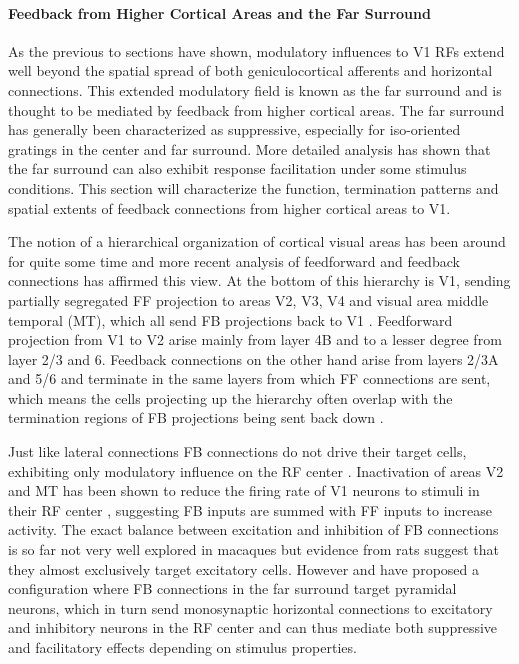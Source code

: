 \paragraph{Feedback from Higher Cortical Areas and the Far Surround}


As the previous to sections have shown, modulatory influences to V1
RFs extend well beyond the spatial spread of both geniculocortical
afferents and horizontal connections. This extended modulatory field
is known as the far surround and is thought to be mediated by feedback
from higher cortical areas. The far surround has generally been
characterized as suppressive, especially for iso-oriented gratings in
the center and far surround. More detailed analysis has shown that the
far surround can also exhibit response facilitation under some
stimulus conditions. This section will characterize the function,
termination patterns and spatial extents of feedback connections from
higher cortical areas to V1.

The notion of a hierarchical organization of cortical visual areas has
been around for quite some time and more recent analysis of
feedforward and feedback connections has affirmed this view. At the
bottom of this hierarchy is V1, sending partially segregated FF
projection to areas V2, V3, V4 and visual area middle temporal (MT),
which all send FB projections back to V1
\citep{Felleman1991}. Feedforward projection from V1 to V2 arise
mainly from layer 4B and to a lesser degree from layer 2/3 and
6. Feedback connections on the other hand arise from layers 2/3A and
5/6 and terminate in the same layers from which FF connections are
sent, which means the cells projecting up the hierarchy often overlap
with the termination regions of FB projections being sent back down
\citep{Angelucci2002}.

Just like lateral connections FB connections do not drive their target
cells, exhibiting only modulatory influence on the RF center
\citep{Bullier2001a}. Inactivation of areas V2 and MT has been shown
to reduce the firing rate of V1 neurons to stimuli in their RF center
\citep{Hupe1998}, suggesting FB inputs are summed with FF inputs to
increase activity. The exact balance between excitation and inhibition
of FB connections is so far not very well explored in macaques but
evidence from rats suggest that they almost exclusively target
excitatory cells. However \cite{Angelucci2006} and \cite{Schwabe2006}
have proposed a configuration where FB connections in the far surround
target pyramidal neurons, which in turn send monosynaptic horizontal
connections to excitatory and inhibitory neurons in the RF center and
can thus mediate both suppressive and facilitatory effects depending
on stimulus properties.

